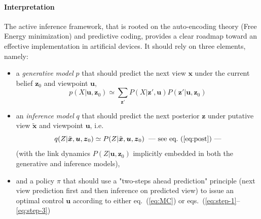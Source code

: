 \documentclass{article} %
\begin{document}

\paragraph{Interpretation}

The active inference framework, that is rooted on the auto-encoding theory (Free Energy minimization) and predictive coding, provides a clear roadmap toward an effective implementation in artificial devices. It should rely on three elements, namely:
\begin{itemize}
	\item a \emph{generative model} $p$ that should predict the next view $\boldsymbol{x}$ under the current belief $\boldsymbol{z}_0$ and viewpoint $\boldsymbol{u}$, 
$$p(X|\boldsymbol{u}, \boldsymbol{z}_0) \simeq \sum_{\boldsymbol{z}'}P(X|\boldsymbol{z}',\boldsymbol{u}) P(\boldsymbol{z}'|\boldsymbol{u},\boldsymbol{z}_0) $$
   \item an \emph{inference model} $q$ that should predict the next posterior $\boldsymbol{z}$ under putative view $\tilde{\boldsymbol{x}}$ and viewpoint $\boldsymbol{u}$, i.e.
$$q(Z|\tilde{\boldsymbol{x}}, \boldsymbol{u},\boldsymbol{z}_0) \simeq  P(Z|\tilde{\boldsymbol{x}}, \boldsymbol{u},\boldsymbol{z}_0) \text{\hspace{.2cm}---~see eq.~(\ref{eq:post})~---}$$  %
(with the link dynamics $P(Z|\boldsymbol{u},\boldsymbol{z}_0)$ implicitly embedded in both the generative and inference models),
\item and a policy $\pi$ that should use a "two-steps ahead prediction" principle (next view prediction first and then inference on predicted view) to issue an optimal control $\boldsymbol{u}$ according to either eq.~(\ref{eq:MC}) or eqs.~(\ref{eq:step-1}--\ref{eq:step-3})
\end{itemize}  
\end{document}
